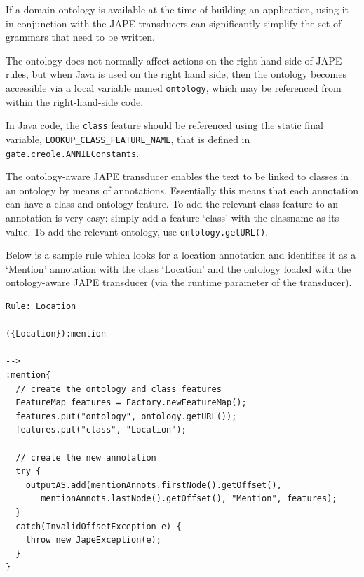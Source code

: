 {If a domain ontology is available at the time of building an application, using
it in conjunction with the JAPE transducers can significantly simplify the set
of grammars that need to be written. 

The ontology does not normally affect actions on the right hand side of JAPE
rules, but when Java is used on the right hand side, then the ontology becomes
accessible via a local variable named {\tt ontology}, which may be referenced 
from within the right-hand-side code.

In Java code, the {\tt class} feature should be referenced using the static
final variable, {\tt LOOKUP\_CLASS\_FEATURE\_NAME}, that is defined in {\tt
gate.creole.ANNIEConstants}.


The ontology-aware JAPE transducer enables the text to be linked to classes in
an ontology by means of annotations. Essentially this means that each annotation
can have a class and ontology feature. To add the relevant class feature to an
annotation is very easy: simply add a feature `class' with the classname as its
value. To add the relevant ontology, use \texttt {ontology.getURL()}.

Below is a sample rule which looks for a location annotation and identifies it
as a `Mention' annotation with the class `Location' and the ontology loaded with
the ontology-aware JAPE transducer (via the runtime parameter of the
transducer).

\begin{small}\begin{verbatim}
Rule: Location

({Location}):mention

-->
:mention{
  // create the ontology and class features
  FeatureMap features = Factory.newFeatureMap();
  features.put("ontology", ontology.getURL());
  features.put("class", "Location");

  // create the new annotation
  try {
    outputAS.add(mentionAnnots.firstNode().getOffset(),
       mentionAnnots.lastNode().getOffset(), "Mention", features);
  }
  catch(InvalidOffsetException e) {
    throw new JapeException(e);
  }
}
\end{verbatim}\end{small}


}
